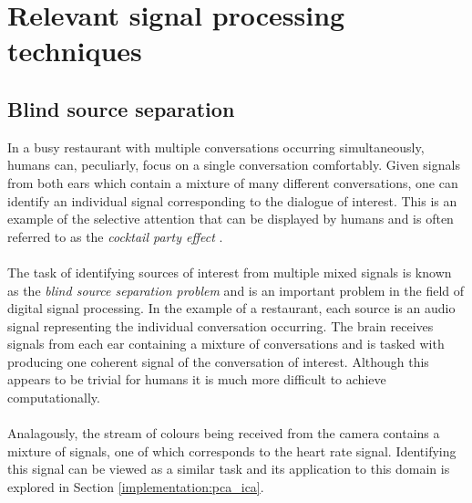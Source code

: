\section{Relevant signal processing techniques}
\subsection{Blind source separation}
\label{ref:bss_prep}
In a busy restaurant with multiple conversations occurring simultaneously, humans can, peculiarly, focus on a single conversation comfortably.
Given signals from both ears which contain a mixture of many different conversations, one can identify an individual signal corresponding to the dialogue of interest.
This is an example of the selective attention that can be displayed by humans and is often referred to as the \textit{cocktail party effect} \cite{Cherry}.
\\\\
The task of identifying sources of interest from multiple mixed signals is known as the \textit{blind source separation problem} and is an important problem in the field of digital signal processing. 
In the example of a restaurant, each source is an audio signal representing the individual conversation occurring. The brain receives signals 
from each ear containing a mixture of conversations and is tasked with producing one coherent signal of the conversation of interest.
Although this appears
to be trivial for humans it is much more difficult to achieve computationally.
\\\\
Analagously, the stream of colours being received from the camera contains a mixture of signals, one of which corresponds to the heart rate signal. Identifying this signal can be viewed as a similar task and its application to this domain is explored in Section \ref{implementation:pca_ica}.




